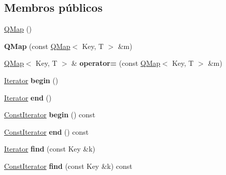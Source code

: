 \subsection*{Membros públicos}
\begin{DoxyCompactItemize}
\item 
\hyperlink{class_q_map_aeaa8ea1bfa8b9a43fc82abbfc76ab549}{Q\-Map} ()
\item 
\hypertarget{class_q_map_abd3fb1ee485890afd1db186722f37763}{{\bfseries Q\-Map} (const \hyperlink{class_q_map}{Q\-Map}$<$ Key, T $>$ \&m)}\label{class_q_map_abd3fb1ee485890afd1db186722f37763}

\item 
\hypertarget{class_q_map_af5a5314ddb6430a85fcd35b272cd78ef}{\hyperlink{class_q_map}{Q\-Map}$<$ Key, T $>$ \& {\bfseries operator=} (const \hyperlink{class_q_map}{Q\-Map}$<$ Key, T $>$ \&m)}\label{class_q_map_af5a5314ddb6430a85fcd35b272cd78ef}

\item 
\hypertarget{class_q_map_a2387033802383edbdc95f9bbb12a707e}{\hyperlink{class_q_map_a8037b7e85b3b6dc9ae44eccdf67eccb6}{Iterator} {\bfseries begin} ()}\label{class_q_map_a2387033802383edbdc95f9bbb12a707e}

\item 
\hypertarget{class_q_map_ab45dae688fc5d8983727abffa4389003}{\hyperlink{class_q_map_a8037b7e85b3b6dc9ae44eccdf67eccb6}{Iterator} {\bfseries end} ()}\label{class_q_map_ab45dae688fc5d8983727abffa4389003}

\item 
\hypertarget{class_q_map_aeb8a08dab209e7d8bd94ea796e8055e7}{\hyperlink{class_q_map_const_iterator}{Const\-Iterator} {\bfseries begin} () const }\label{class_q_map_aeb8a08dab209e7d8bd94ea796e8055e7}

\item 
\hypertarget{class_q_map_afd94c820b193c151ddbaae99185a24f4}{\hyperlink{class_q_map_const_iterator}{Const\-Iterator} {\bfseries end} () const }\label{class_q_map_afd94c820b193c151ddbaae99185a24f4}

\item 
\hypertarget{class_q_map_ac7135ba894c82a85d2fd8a6b5e9a66c9}{\hyperlink{class_q_map_a8037b7e85b3b6dc9ae44eccdf67eccb6}{Iterator} {\bfseries find} (const Key \&k)}\label{class_q_map_ac7135ba894c82a85d2fd8a6b5e9a66c9}

\item 
\hypertarget{class_q_map_a8467f6126b2aa4feb7f9ff84551a76e4}{\hyperlink{class_q_map_const_iterator}{Const\-Iterator} {\bfseries find} (const Key \&k) const }\label{class_q_map_a8467f6126b2aa4feb7f9ff84551a76e4}


\end{DoxyCompactItemize}

